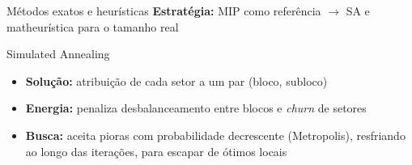 \documentclass[aspectratio=169,11pt]{beamer}
\begin{document}
\begin{frame}{Métodos exatos e heurísticas}
  \vspace{0.4cm}
  \centering
  \textbf{Estratégia:} MIP como referência $\rightarrow$ SA e matheurística para o tamanho real
\end{frame}

\begin{frame}{Simulated Annealing}
  \begin{itemize}
    \item \textbf{Solução:} atribuição de cada setor a um par (bloco, subloco)
    \item \textbf{Energia:} penaliza desbalanceamento entre blocos e \textit{churn} de setores
    \item \textbf{Busca:} aceita pioras com probabilidade decrescente (Metropolis), resfriando ao longo das iterações, para escapar de ótimos locais
  \end{itemize}
\end{frame}
\end{document}
